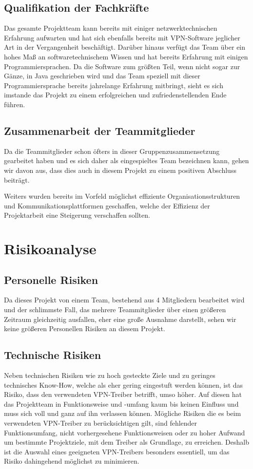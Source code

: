 \documentclass[a4paper,12pt]{scrreprt}
\begin{document}
		\subsection{Qualifikation der Fachkr\"afte}
			
		
		Das gesamte Projektteam kann bereits mit einiger netzwerktechnischen Erfahrung aufwarten und hat sich ebenfalls bereits mit VPN-Software jeglicher Art in der Vergangenheit beschäftigt. Darüber hinaus verfügt das Team über ein hohes Maß an softwaretechnischem Wissen und hat bereits Erfahrung mit einigen Programmiersprachen. Da die Software zum größten Teil, wenn nicht sogar zur Gänze, in Java geschrieben wird und das Team speziell mit dieser Programmiersprache bereits jahrelange Erfahrung mitbringt, sieht es sich imstande das Projekt zu einem erfolgreichen und zufriedenstellenden Ende führen.
		
		\subsection{Zusammenarbeit der Teammitglieder}
		
		
		Da die Teammitglieder schon öfters in dieser Gruppenzusammensetzung gearbeitet haben und es sich daher als eingespieltes Team bezeichnen kann, gehen wir davon aus, dass dies auch in diesem Projekt zu einem positiven Abschluss beiträgt.
		
		Weiters wurden bereits im Vorfeld möglichst effiziente Organisationsstrukturen und Kommunikationsplattformen geschaffen, welche der Effizienz der Projektarbeit eine Steigerung verschaffen sollten.
			
	\section{Risikoanalyse}
		
		\subsection{Personelle Risiken}
		Da dieses Projekt von einem Team, bestehend aus 4 Mitgliedern bearbeitet wird und der schlimmste Fall, das mehrere Teammitglieder über einen größeren Zeitraum gleichzeitig ausfallen, eher eine große Ausnahme darstellt, sehen wir keine größeren Personellen Risiken an diesem Projekt.
		
		\subsection{Technische Risiken}
		Neben technischen Risiken wie zu hoch gesteckte Ziele und zu geringes technisches Know-How, welche als eher gering eingestuft werden können, ist das Risiko, dass den verwendeten VPN-Treiber betrifft, umso höher. Auf diesen hat das Projektteam in Funktionsweise und -umfang kaum bis keinen Einfluss und muss sich voll und ganz auf ihn verlassen können. Mögliche Risiken die es beim verwendeten VPN-Treiber zu berücksichtigen gilt, sind fehlender Funktionsumfang, nicht vorhergesehene Funktionsweisen oder zu hoher Aufwand um bestimmte Projektziele, mit dem Treiber als Grundlage, zu erreichen. Deshalb ist die Auswahl eines geeigneten VPN-Treibers besonders essentiell, um das Risiko dahingehend möglichst zu minimieren. 
		
\end{document}
